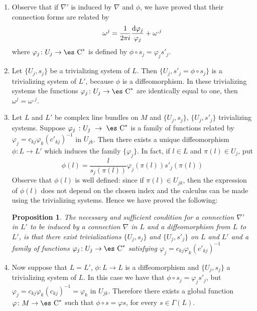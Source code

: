 \documentclass[12pt]{article}
\theoremstyle{plain}
\newtheorem{prop}{Proposition}
\def\beq{\begin{equation}}
\def\eeq{\end{equation}}
\def\d{{\rm d}}
\def\Complex{\mbox{\es C}}
\begin{document}
\begin{enumerate}
\item
Observe that if $\nabla '$ is induced by $\nabla$ and $\phi$,
we have proved that their connection forms are related by
\beq
\omega^j = \frac{1}{2\pi i}\frac{\d \varphi_j}{\varphi_j} + \omega^{,j}
\label{numerado}
\eeq
where $\varphi_j \colon U_j \to \Complex^*$ is defined by
$\phi \circ s_j = \varphi_j s'_j$.
\item
Let $\{ U_j,s_j \}$ be a trivializing system of $L$.
Then $\{ U_j,s'_j=\phi \circ s_j \}$ is a trivializing system of $L'$,
because $\phi$ is a diffeomorphism.
In these trivializing systems the functions
$\varphi_j \colon U_j \to \Complex^*$
are identically equal to one, then
$\omega^j = \omega^{,j}$.
\item
Let $L$ and $L'$ be complex line bundles on $M$
and $\{ U_j,s_j \}$, $\{ U_j,s'_j \}$
trivializing systems.
Suppose
$\varphi_j~\colon U_j~\to~\Complex^*$
is a family of functions related by
$\varphi_j = c_{kj} \varphi_k (c'_{kj})^{-1}$
in $U_{jk}$.
Then there exists a unique diffeomorphism
$\phi \colon L \to L'$
which induces the family $\{ \varphi_j \}$.
In fact, if $l \in L$ and $\pi (l) \in U_j$, put
$$
\phi (l) = \frac{l}{s_j (\pi (l))}\varphi_j (\pi (l))s'_j (\pi (l))
$$
Observe that $\phi (l)$ is well defined:
since if $\pi (l) \in U_{jk}$, then the expression of $\phi (l)$
does not depend on the chosen index and
the calculus can be made using the trivializing systems.
Hence we have proved the following:

\begin{prop}
The necessary and sufficient condition for
a connection $\nabla '$ in $L'$ to be induced by
a connection $\nabla$ in $L$ and a diffeomorphism
from $L$ to $L'$, is that there exist trivializations
$\{ U_j,s_j \}$ and $\{ U_j,s'_j \}$
on $L$ and $L'$ and a family of functions
$\varphi_j \colon U_j \to \Complex^*$
satisfying $\varphi_j = c_{kj} \varphi_k (c'_{kj})^{-1}$
\end{prop}

\item
Now suppose that $L = L'$,
$\phi \colon L \to L$ is a diffeomorphism and
$\{ U_j,s_j \}$ a trivializing system of $L$.
In this case we have that
$\phi \circ s_j = \varphi_j s'_j$,
but $\varphi_j = c_{kj}\varphi_k(c_{kj})^{-1}=\varphi_k$ in $U_{jk}$.
Therefore there exists a global function
$\varphi \colon M \to \Complex^*$
such that $\phi \circ s = \varphi s$, for every $s \in \Gamma (L)$.


\end{enumerate}
\end{document}
